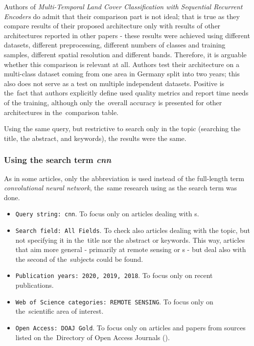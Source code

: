 Authors of \textit{Multi-Temporal Land Cover Classification with Sequential Recurrent Encoders} do admit that their comparison part is not ideal; that is true as they compare results of their proposed architecture only with results of other architectures reported in other papers - these results were achieved using different datasets, different preprocessing, different numbers of classes and training samples, different spatial resolution and different bands. Therefore, it is arguable whether this comparison is relevant at all. Authors test their architecture on a multi-class dataset coming from one area in Germany split into two years; this also does not serve as a test on multiple independent datasets. Positive is the~fact that authors explicitly define used quality metrics and report time needs of the training, although only the~overall accuracy is presented for other architectures in the~comparison table.

Using the same query, but restrictive to search only in the topic (searching the title, the abstract, and keywords), the results were the same.

\subsubsection{Using the search term \textit{cnn}}
\label{wos-papers-cnn}

As in some articles, only the abbreviation \textit{} is used instead of the full-length term \textit{convolutional neural network}, the~same research using \textit{} as the search term was done.

\begin{itemize}
	\item \verb|Query string: cnn|. To focus only on articles dealing with s.
	\item \verb|Search field: All Fields|. To check also articles dealing with the topic, but not specifying it in the~title nor the abstract or keywords. This way, articles that aim more general - primarily at remote sensing or s - but deal also with the second of the~subjects could be found.
	\item \verb|Publication years: 2020, 2019, 2018|. To focus only on recent publications.
	\item \verb|Web of Science categories: REMOTE SENSING|. To focus only on the~scien\-ti\-fic area of interest.
	\item \verb|Open Access: DOAJ Gold|. To focus only on articles and papers from sources listed on the~Di\-rectory of Open Access Journals ().
\end{itemize}

